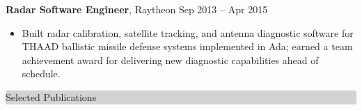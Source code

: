 \documentclass{article} %
\newcommand{\rsection}[1]{
  \hspace{-0.4cm}\vspace{0.1cm}
\colorbox{lightgrey}{
\begin{minipage}{1.07\linewidth}
\vspace{0.22cm}
\fontsize{14pt}{16pt}\selectfont #1
\vspace{0.12cm}
\end{minipage}
}
\par\nopagebreak %
}
\newcommand{\rjob}[2]{
  \hspace*{-0.3cm}
{\fontsize{10pt}{12pt}\selectfont #1} \hfill #2
\hspace*{-1.2cm}
}
\newenvironment{ritemize}{
\par\nopagebreak %
\vspace{-\parskip}
\hspace*{-0.8cm}
\begin{minipage}{1.05\linewidth}
\fontsize{10pt}{11pt}\selectfont
\vspace{0.1cm}
\begin{itemize}[itemsep=0pt,parsep=0pt,topsep=1pt,partopsep=0pt]
}{
\end{itemize}
\end{minipage}
\vspace{-0.1cm}
}
\newcommand{\ritem}{
\item[-]
}
\begin{document}
\rjob{\textbf{Radar Software Engineer}, Raytheon}{Sep 2013 -- Apr 2015}
\begin{ritemize}
\ritem Built radar calibration, satellite tracking, and antenna diagnostic software for THAAD ballistic missile defense systems implemented in Ada; earned a team achievement award for delivering new diagnostic capabilities ahead of schedule.
\end{ritemize}













\vspace{0.2cm}
\rsection{Selected Publications}
\end{document}
